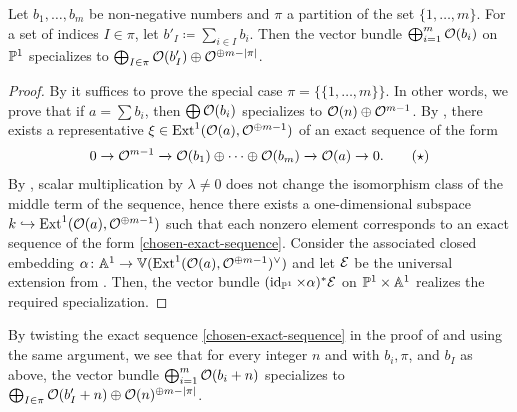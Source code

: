 \begin{proposition} \label{specialization-partitions}
	Let $b_1,\dotsc,b_m$ be non-negative numbers and $\pi$ a partition of the set $\{1,\dotsc,m\}$. For a set of indices $I\in \pi$, let $b'_I \coloneqq \sum_{i \in I} b_i$. Then the vector bundle $\bigoplus_{i=1}^m \mathcal{O} (b_i)$ on $\mathbb{P}^1$ specializes to $\bigoplus_{I\in\pi} \mathcal{O}(b'_I) \oplus \mathcal{O}^{\oplus m-\lvert\pi\rvert}$.	
\end{proposition}

\begin{proof}
	By  it suffices to prove the special case $\pi = \{\{1,\dotsc,m\}\}$. In other words, we prove that if $a = \sum b_i$, then $\bigoplus\mathcal{O}(b_i)$ specializes to $\mathcal{O}(n)\oplus \mathcal{O}^{m-1}$. By , there exists a representative $\xi \in \operatorname{Ext}^1(\mathcal{O}(a),\mathcal{O}^{\oplus m-1})$ of an exact sequence of the form
	\begin{align} \label{chosen-exact-sequence}
		0 \to \mathcal{O}^{m-1} \xrightarrow{} \mathcal{O}(b_1)\oplus \dotsb \oplus \mathcal{O}(b_m) \xrightarrow{} \mathcal{O}(a) \to 0. \tag{$\star$}
	\end{align}
	By , scalar multiplication by $\lambda \neq 0$ does not change the isomorphism class of the middle term of the sequence, hence there exists a one-dimensional subspace $k \injectto \Ext^1(\mc{O}(a),\mc{O}^{\oplus m-1})$ such that each nonzero element corresponds to an exact sequence of the form
	\ref{chosen-exact-sequence}. Consider the associated closed embedding $\alpha \colon \mathbb{A}^1 \to \mathbb{V}(\operatorname{Ext}^1(\mathcal{O}(a),\mathcal{O}^{\oplus m-1})^\vee)$ and let $\mathcal{E}$ be the universal extension from . Then, the vector bundle $(\operatorname{id}_{\mathbb{P}^1}\times\alpha)^{*}\mathcal{E}$ on $\mathbb{P}^1\times\mathbb{A}^1$ realizes the required specialization. 
\end{proof}

\begin{remark}
	By twisting the exact sequence \ref{chosen-exact-sequence} in the proof of  and using the same argument, we see that for every integer $n$ and with $b_i, \pi$, and $b_I$ as above, the vector bundle $\bigoplus_{i=1}^m \mathcal{O} (b_i+n)$ specializes to $\bigoplus_{I\in\pi} \mathcal{O}(b'_I+n) \oplus \mathcal{O}(n)^{\oplus m-\lvert\pi\rvert}$.
\end{remark}